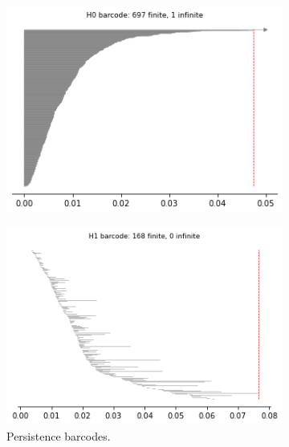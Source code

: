 \begin{figure}[H]
\begin{subfigure}[b]{0.25\textwidth}
\end{subfigure}
\begin{subfigure}[b]{0.24\textwidth}
    \includegraphics[width=\textwidth]{figures/X5_H0_barcode.png}
    \caption{}
\end{subfigure}
\begin{subfigure}[b]{0.24\textwidth}
    \includegraphics[width=\textwidth]{figures/X5_H1_barcode.png}
        \caption{Persistence barcodes.}
\end{subfigure}
\begin{subfigure}[b]{0.24\textwidth}

\end{subfigure}
\end{figure}
